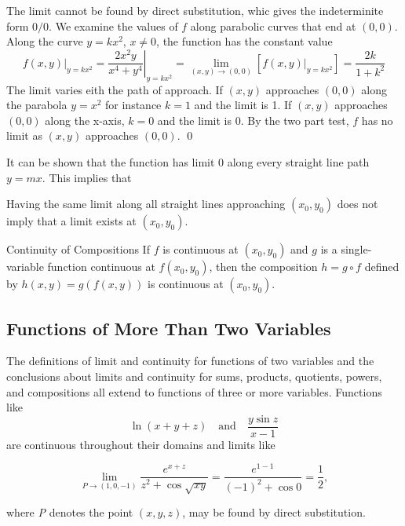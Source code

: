 \documentclass[12pt,a4paper]{article}
\newenvironment{ruleBox}[1]{\begin{rulebox}{#1}}{\end{rulebox}\vspace{1\baselineskip}}
\newenvironment{mynote}{\vspace{1\baselineskip}\begin{note}}{\end{note}\vspace{1\baselineskip}}
\begin{document}
\begin{solution}
    The limit cannot be found by direct substitution, whic gives the indeterminite form \(0 \slash 0\).
    We examine the values of \(f\) along parabolic curves that end at \((0,0)\). Along the curve \(y = kx^2\), \(x \neq 0\), the function has the constant value
    \[\left. f(x,y) \right|_{y = kx^2} = \left. \frac{2x^2y}{x^4+y^4} \right|_{y=kx^2} = \lim_{(x,y) \to (0,0)}\left[\left.f(x,y)\right|_{y=kx^2}\right] = \frac{2k}{1+k^2}\]
The limit varies eith the path of approach. If \((x,y)\) approaches \((0,0)\) along the parabola \(y=x^2\) for instance \(k=1\) and the limit is 1. If \((x,y)\) approaches \((0,0)\) along the x-axis, \(k=0\) and the limit is 0. By the two part test, \(f\) has no limit as \((x,y)\) approaches \((0,0)\). \hfill \qed

It can be shown that the function has limit 0 along every straight line path \(y = mx\). This implies that 

\begin{mynote}
Having the same limit along all straight lines approaching \((x_0,y_0)\) does not imply that a limit exists at \((x_0,y_0)\).
\end{mynote}

\end{solution}

\begin{ruleBox}{Continuity of Compositions}
    If \(f\) is continuous at \((x_0,y_0)\) and \(g\) is a single-variable function continuous at \(f(x_0,y_0)\), then the composition \(h = g \circ f\) defined  by \(h(x,y) = g(f(x,y))\) is continuous at \((x_0,y_0)\).

\end{ruleBox}

\subsection{Functions of More Than Two Variables}
The definitions of limit and continuity for functions of two variables and the conclusions about limits and continuity for sums, products, quotients, powers, and compositions all extend to functions of three or more variables. Functions like
\[\ln(x+ y +z) \quad \text{and} \quad \frac{y \sin{z}}{x-1}\]
are continuous throughout their domains and limits like

\[\lim _{P \rightarrow(1,0,-1)} \frac{e^{x+z}}{z^2+\cos \sqrt{x y}}=\frac{e^{1-1}}{(-1)^2+\cos 0}=\frac{1}{2},\]

where \textit{P} denotes the point \((x,y,z)\), may be found by direct substitution.
\end{document}
